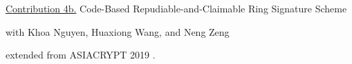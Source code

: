 
\begin{frame}{}
	\underline{Contribution 4b.} Code-Based Repudiable-and-Claimable Ring Signature Scheme
	
	{\small with Khoa Nguyen, Huaxiong Wang, and Neng Zeng}
	
	extended from ASIACRYPT 2019 \cite{NguyenTWZ19}.
\end{frame}